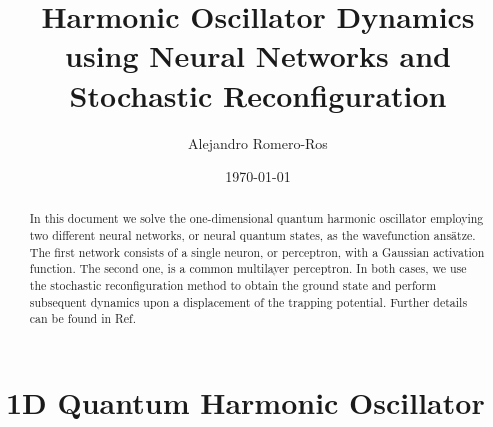 \documentclass[aps,pre,superscriptaddress,amsmath,amssymb,amsfonts,twocolumn,showpacs,notitlepage]{revtex4-1}
\begin{document}
	
	\title{Harmonic Oscillator Dynamics using Neural Networks and Stochastic Reconfiguration}
	\date{\today}
	
	\author{Alejandro Romero-Ros}
	
	\begin{abstract}
		In this document we solve the one-dimensional quantum harmonic oscillator employing two different neural networks, or neural quantum states, as the wavefunction ansätze.
		The first network consists of a single neuron, or perceptron, with a Gaussian activation function.
		The second one, is a common multilayer perceptron.
		In both cases, we use the stochastic reconfiguration method to obtain the ground state and perform subsequent dynamics upon a displacement of the trapping potential.
		Further details can be found in Ref.~\cite{GASP}
	\end{abstract}
		
	\maketitle
	
\section{1D Quantum Harmonic Oscillator} \label{sec:HO}
\end{document}
